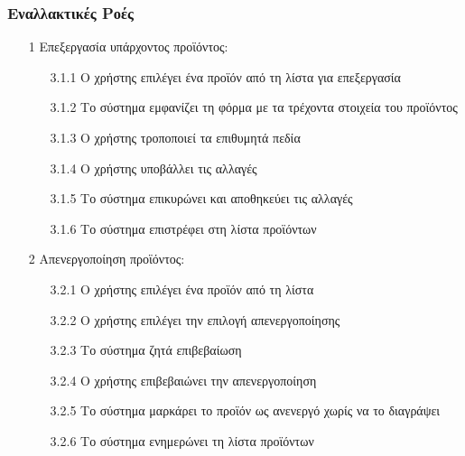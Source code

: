 \documentclass[12pt,a4paper,twoside]{book}
\begin{document}
\subsubsection{Εναλλακτικές Ροές}
\begin{enumerate}
  \item[1 ] Επεξεργασία υπάρχοντος προϊόντος:
        \begin{enumerate}
          \item[3.1.1 ] Ο χρήστης επιλέγει ένα προϊόν από τη λίστα για επεξεργασία
          \item[3.1.2 ] Το σύστημα εμφανίζει τη φόρμα με τα τρέχοντα στοιχεία του προϊόντος
          \item[3.1.3 ] Ο χρήστης τροποποιεί τα επιθυμητά πεδία %
          \item[3.1.4 ] Ο χρήστης υποβάλλει τις αλλαγές
          \item[3.1.5 ] Το σύστημα επικυρώνει και αποθηκεύει τις αλλαγές
          \item[3.1.6 ] Το σύστημα επιστρέφει στη λίστα προϊόντων
        \end{enumerate}
  \item[2 ] Απενεργοποίηση προϊόντος:
        \begin{enumerate}
          \item [3.2.1 ] Ο χρήστης επιλέγει ένα προϊόν από τη λίστα
          \item [3.2.2 ] Ο χρήστης επιλέγει την επιλογή απενεργοποίησης
          \item [3.2.3 ] Το σύστημα ζητά επιβεβαίωση
          \item [3.2.4 ] Ο χρήστης επιβεβαιώνει την απενεργοποίηση
          \item [3.2.5 ] Το σύστημα μαρκάρει το προϊόν ως ανενεργό χωρίς να το διαγράψει %
          \item [3.2.6 ] Το σύστημα ενημερώνει τη λίστα προϊόντων
        \end{enumerate}

\end{enumerate}
\end{document}

